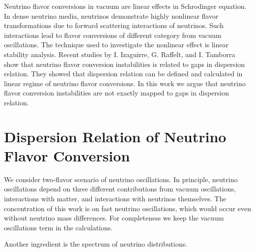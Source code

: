 \documentclass[%
 reprint,
 amsmath,amssymb,
 aps,
 prd
]{revtex4-1}
\begin{document}
Neutrino flavor conversions in vacuum are linear effects in Schrodinger equation. In dense neutrino media, neutrinos demonstrate highly nonlinear flavor transformations due to forward scattering interactions of neutrinos. Such interactions lead to flavor conversions of different category from vacuum oscillations. The technique used to investigate the nonlinear effect is linear stability analysis.\cite{Banerjee2011a,Raffelt2013} Recent studies by I. Izaguirre, G. Raffelt, and I. Tamborra show that neutrino flavor conversion instabilities is related to gaps in dispersion relation.\cite{Izaguirre2016a} They showed that dispersion relation can be defined and calculated in linear regime of neutrino flavor conversions. In this work we argue that neutrino flavor conversion instabilities are not exactly mapped to gaps in dispersion relation.


\section{\label{sec-dr}Dispersion Relation of Neutrino Flavor Conversion}

We consider two-flavor scenario of neutrino oscillations. In principle, neutrino oscillations depend on three different contributions from vacuum oscillations, interactions with matter, and interactions with neutrinos themselves. The concentration of this work is on fast neutrino oscillations, which would occur even without neutrino mass differences. For completeness we keep the vacuum oscillations term in the calculations.

Another ingredient is the spectrum of neutrino distributions.
\end{document}
